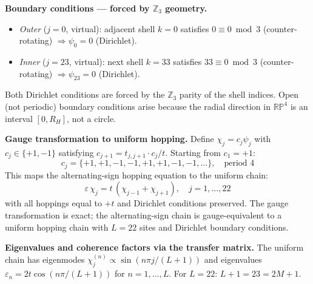 \documentclass[12pt,a4paper]{article}
\begin{document}
\textbf{Boundary conditions --- forced by $\mathbb{Z}_3$ geometry.}
\begin{itemize}
  \item \textit{Outer} ($j=0$, virtual): adjacent shell $k=0$ satisfies
    $0 \equiv 0\bmod 3$ (counter-rotating) $\Rightarrow \psi_0 = 0$ (Dirichlet).
  \item \textit{Inner} ($j=23$, virtual): next shell $k=33$ satisfies
    $33 \equiv 0\bmod 3$ (counter-rotating) $\Rightarrow \psi_{23} = 0$ (Dirichlet).
\end{itemize}
Both Dirichlet conditions are forced by the $\mathbb{Z}_3$ parity of the shell
indices. Open (not periodic) boundary conditions arise because the radial direction
in $\mathbb{RP}^4$ is an interval $[0,R_H]$, not a circle.

\textbf{Gauge transformation to uniform hopping.}
Define $\chi_j = c_j\psi_j$ with $c_j\in\{+1,-1\}$ satisfying
$c_{j+1} = t_{j,j+1}\cdot c_j/t$. Starting from $c_1=+1$:
\begin{equation}
  c_j = \{+1,+1,-1,-1,+1,+1,-1,-1,\ldots\},\quad\text{period 4}
  \label{eq:gauge_factors}
\end{equation}
This maps the alternating-sign hopping equation to the uniform chain:
\begin{equation}
  \varepsilon\,\chi_j = t\,(\chi_{j-1} + \chi_{j+1}),\quad j=1,\ldots,22
  \label{eq:uniform_hopping}
\end{equation}
with all hoppings equal to $+t$ and Dirichlet conditions preserved. The gauge
transformation is exact; the alternating-sign chain is gauge-equivalent to a
uniform hopping chain with $L=22$ sites and Dirichlet boundary conditions.

\textbf{Eigenvalues and coherence factors via the transfer matrix.}
The uniform chain has eigenmodes $\chi_j^{(n)} \propto \sin(n\pi j/(L+1))$ and
eigenvalues $\varepsilon_n = 2t\cos(n\pi/(L+1))$ for $n=1,\ldots,L$.
For $L=22$: $L+1 = 23 = 2M+1$.
\end{document}
